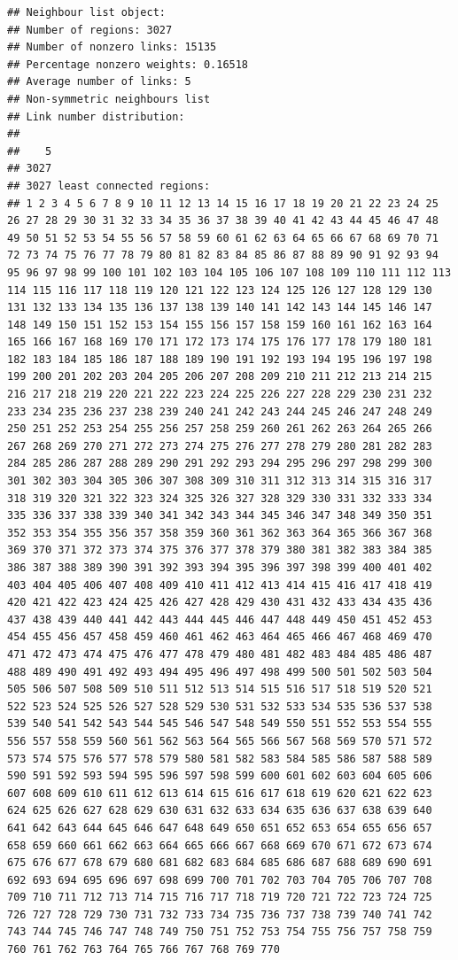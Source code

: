 \documentclass[11pt,]{article}
\begin{document}
\begin{verbatim}
## Neighbour list object:
## Number of regions: 3027 
## Number of nonzero links: 15135 
## Percentage nonzero weights: 0.16518 
## Average number of links: 5 
## Non-symmetric neighbours list
## Link number distribution:
## 
##    5 
## 3027 
## 3027 least connected regions:
## 1 2 3 4 5 6 7 8 9 10 11 12 13 14 15 16 17 18 19 20 21 22 23 24 25 26 27 28 29 30 31 32 33 34 35 36 37 38 39 40 41 42 43 44 45 46 47 48 49 50 51 52 53 54 55 56 57 58 59 60 61 62 63 64 65 66 67 68 69 70 71 72 73 74 75 76 77 78 79 80 81 82 83 84 85 86 87 88 89 90 91 92 93 94 95 96 97 98 99 100 101 102 103 104 105 106 107 108 109 110 111 112 113 114 115 116 117 118 119 120 121 122 123 124 125 126 127 128 129 130 131 132 133 134 135 136 137 138 139 140 141 142 143 144 145 146 147 148 149 150 151 152 153 154 155 156 157 158 159 160 161 162 163 164 165 166 167 168 169 170 171 172 173 174 175 176 177 178 179 180 181 182 183 184 185 186 187 188 189 190 191 192 193 194 195 196 197 198 199 200 201 202 203 204 205 206 207 208 209 210 211 212 213 214 215 216 217 218 219 220 221 222 223 224 225 226 227 228 229 230 231 232 233 234 235 236 237 238 239 240 241 242 243 244 245 246 247 248 249 250 251 252 253 254 255 256 257 258 259 260 261 262 263 264 265 266 267 268 269 270 271 272 273 274 275 276 277 278 279 280 281 282 283 284 285 286 287 288 289 290 291 292 293 294 295 296 297 298 299 300 301 302 303 304 305 306 307 308 309 310 311 312 313 314 315 316 317 318 319 320 321 322 323 324 325 326 327 328 329 330 331 332 333 334 335 336 337 338 339 340 341 342 343 344 345 346 347 348 349 350 351 352 353 354 355 356 357 358 359 360 361 362 363 364 365 366 367 368 369 370 371 372 373 374 375 376 377 378 379 380 381 382 383 384 385 386 387 388 389 390 391 392 393 394 395 396 397 398 399 400 401 402 403 404 405 406 407 408 409 410 411 412 413 414 415 416 417 418 419 420 421 422 423 424 425 426 427 428 429 430 431 432 433 434 435 436 437 438 439 440 441 442 443 444 445 446 447 448 449 450 451 452 453 454 455 456 457 458 459 460 461 462 463 464 465 466 467 468 469 470 471 472 473 474 475 476 477 478 479 480 481 482 483 484 485 486 487 488 489 490 491 492 493 494 495 496 497 498 499 500 501 502 503 504 505 506 507 508 509 510 511 512 513 514 515 516 517 518 519 520 521 522 523 524 525 526 527 528 529 530 531 532 533 534 535 536 537 538 539 540 541 542 543 544 545 546 547 548 549 550 551 552 553 554 555 556 557 558 559 560 561 562 563 564 565 566 567 568 569 570 571 572 573 574 575 576 577 578 579 580 581 582 583 584 585 586 587 588 589 590 591 592 593 594 595 596 597 598 599 600 601 602 603 604 605 606 607 608 609 610 611 612 613 614 615 616 617 618 619 620 621 622 623 624 625 626 627 628 629 630 631 632 633 634 635 636 637 638 639 640 641 642 643 644 645 646 647 648 649 650 651 652 653 654 655 656 657 658 659 660 661 662 663 664 665 666 667 668 669 670 671 672 673 674 675 676 677 678 679 680 681 682 683 684 685 686 687 688 689 690 691 692 693 694 695 696 697 698 699 700 701 702 703 704 705 706 707 708 709 710 711 712 713 714 715 716 717 718 719 720 721 722 723 724 725 726 727 728 729 730 731 732 733 734 735 736 737 738 739 740 741 742 743 744 745 746 747 748 749 750 751 752 753 754 755 756 757 758 759 760 761 762 763 764 765 766 767 768 769 770 
\end{verbatim}
\end{document}
